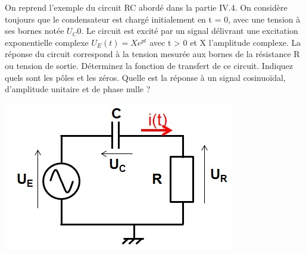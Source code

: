 \documentclass[]{report}
\begin{document}
	\begin{minipage}[l]{0.7\linewidth}
		On reprend l'exemple du circuit RC abordé dans la partie IV.4. On considère toujours que le condensateur est chargé initialement en t = 0, avec une tension à ses bornes notée $U_C0$. Le circuit est excité par un signal délivrant une excitation exponentielle complexe $U_{E}(t)=Xe^{pt}$ avec t > 0 et X l'amplitude complexe. La réponse du circuit correspond à la tension mesurée aux bornes de la résistance R ou tension de sortie. Déterminez la fonction de transfert de ce circuit. Indiquez quels sont les pôles et les zéros. Quelle est la réponse à un signal cosinuoïdal, d'amplitude unitaire et de phase nulle ?	
	\end{minipage} \hfill
	\begin{minipage}[r]{0.4\linewidth}
		\includegraphics[scale=0.5]{images/circuit_RC_reponse_forcee.jpg} 	
	\end{minipage}
	\vspace{0.5\baselineskip}
\end{document}
